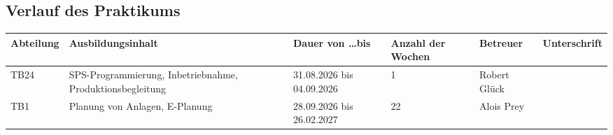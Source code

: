\begin{landscape}%

    \thispagestyle{empty}
    \section*{Verlauf des Praktikums}

    \begin{table}[H]
        \begin{tabularx}{\linewidth}{|X|X|X|X|X|X|}
            \hline
            \textbf{Abteilung} & \textbf{Ausbildungsinhalt}                                & \textbf{Dauer von \ldots bis} & \textbf{Anzahl der Wochen} & \textbf{Betreuer} & \textbf{Unterschrift} \\
            \hline
            TB24               & SPS-Programmierung, Inbetriebnahme, Produktionsbegleitung & 31.08.2026 bis 04.09.2026     & 1                          & Robert Glück      &                       \\
            \hline
            TB1                & Planung von Anlagen, E-Planung                            & 28.09.2026 bis 26.02.2027     & 22                         & Alois Prey        &                       \\
            \hline
        \end{tabularx}
    \end{table}

\end{landscape}
